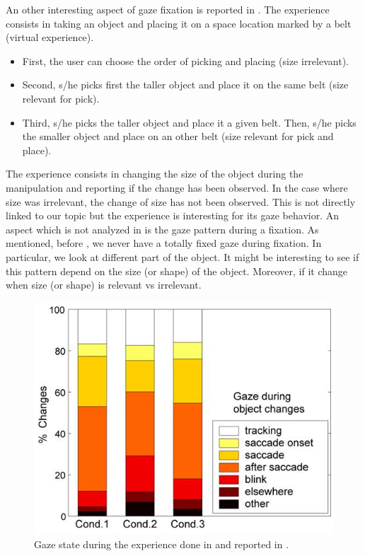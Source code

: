 \documentclass[11pt,a4paper]{article}
\begin{document}
An other interesting aspect of gaze fixation is reported in \cite{Hayhoe2005}. The experience consists in taking an object and placing it on a space location marked by a belt (virtual experience).
\begin{itemize}
\item First, the user can choose the order of picking and placing (size irrelevant). 
\item Second, s/he picks first the taller object and place it on the same belt (size relevant for pick).
\item Third, s/he picks the taller object and place it a given belt. Then, s/he picks the smaller object and place on an other belt (size relevant for pick and place). 
\end{itemize}
The experience consists in changing the size of the object during the manipulation and reporting if the change has been observed. In the case where size was irrelevant, the change of size has not been observed. This is not directly linked to our topic but the experience is interesting for its gaze behavior. An aspect which is not analyzed in \cite{Triesh2003} is the gaze pattern during a fixation. As mentioned, before \cite{Land2009}, we never have a totally fixed gaze during fixation. In particular, we look at different part of the object. It might be interesting to see if this pattern depend on the size (or shape) of the object. Moreover, if it change when size (or shape) is relevant vs irrelevant.

\begin{figure}[!h]
\centering
\includegraphics[scale=0.4]{Pictures/GazeSizeObject_Triesch.png}
\caption{Gaze state during the experience done in \cite{Triesh2003} and reported in \cite{Hayhoe2005}. \label{GazeSizeObject_Triesch}}
\end{figure}
\end{document}

